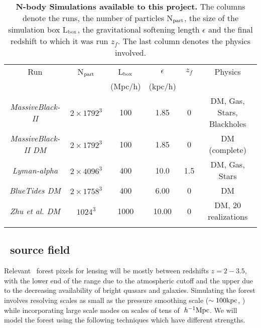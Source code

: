 \begin{table}[h]
\begin{center}
\footnotesize
\begin{tabular}{cccccc}

\hline\hline
  Run & N$_{\rm part}$   &   L$_{\rm box}$ &$\epsilon$&  $z_f$ & Physics \\
& & (Mpc/h) & (kpc/h)& & \\
  \hline
  {\it MassiveBlack-II} & $2\times 1792^3$ & 100 & 1.85 & 0 & DM, Gas, Stars, 
Blackholes\\
 {\it MassiveBlack-II  DM} & $2\times 1792^3$ & 100 & 1.85 & 0 & DM (complete)\\
\hline
  {\it Lyman-alpha} & $2\times 4096^3$ & 400 & 10.0&  1.5 & DM, Gas, 
Stars \\
{\it BlueTides DM} & $2\times 1758^3$ & 400 & 6.00 & 0 & DM  \\
{\it Zhu et al. DM} & $1024^3$ & 1000 & 10.00 & 0 & DM, 20 realizations  \\
\hline\\
\end{tabular}
\normalsize
\end{center}
\vspace{-1cm}
\caption{\footnotesize {\bf N-body Simulations available to this project.} 
  The columns denote the runs, the number of particles
  N$_{\rm part}$, the size of the simulation box  L$_{\rm box}$, the
  gravitational softening length $\epsilon$ and the final redshift 
to which it was run $z_f$. The
  last column denotes the physics involved. }
\label{tab_runs}
\end{table}
\vspace{-0.5cm}


\subsection{\lya\ source field}

Relevant \lya\ forest pixels for lensing will be mostly between 
 redshifts $z=2-3.5$, with the lower end of the range due to the atmospheric 
cutoff and the upper due to the decreasing availability of bright 
quasars and galaxies. Simulating the forest  involves resolving scales as
small as the pressure smoothing scale ($\sim 100 {\rm kpc}$, \cite{peeples10}) while
incorporating large scale modes on scales of tens of $\;h^{-1}{\rm Mpc}$.
We will model the forest using the following
 techniques which have different
strengths.


